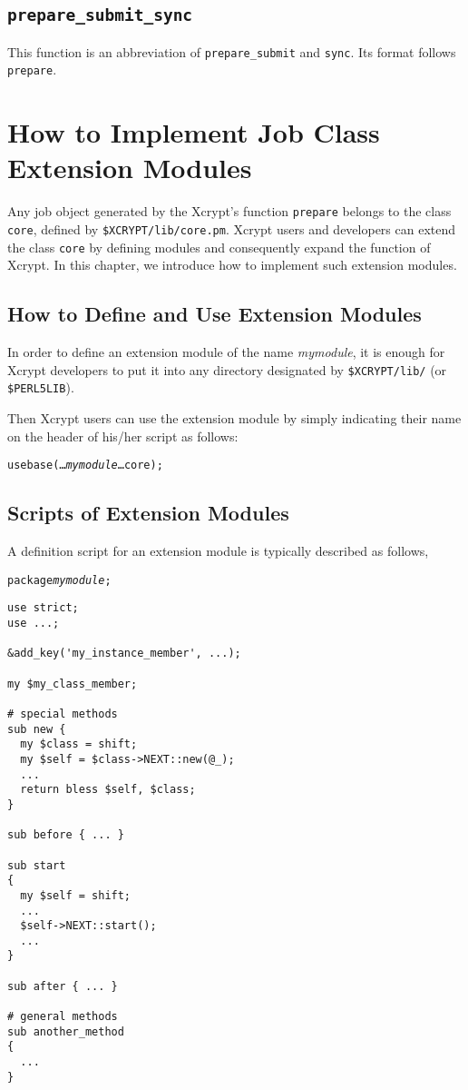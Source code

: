 \documentclass[a4paper,10pt]{report}
\def\|{\verb|} %|
\begin{document}
\section{\texttt{prepare\_submit\_sync}}

This function is an abbreviation of \texttt{prepare\_submit} and
\texttt{sync}.  Its format follows \texttt{prepare}.

\appendix
\chapter{How to Implement Job Class Extension Modules}

Any job object generated by the Xcrypt's function \|prepare| belongs
to the class \|core|, defined by \|$XCRYPT/lib/core.pm|.
Xcrypt users and developers can extend the class \|core| by defining
modules and consequently expand the function of Xcrypt.
In this chapter, we introduce how to implement such extension modules.

\section{How to Define and Use Extension Modules}

In order to define an extension module of the name \textit{mymodule},
it is enough for Xcrypt developers to put it into any directory
designated by \|$XCRYPT/lib/| (or \|$PERL5LIB|).

Then Xcrypt users can use the extension module by simply indicating
their name on the header of his/her script as follows:
\begin{screen}
\begin{alltt}
use base (\ldots {\it mymodule} \ldots core);
\end{alltt}
\end{screen}


\section{Scripts of Extension Modules}

A definition script for an extension module is typically described as follows,
\begin{boxnote}
  \begin{alltt}
package {\it mymodule};
  \end{alltt}
\begin{verbatim}
use strict;
use ...;

&add_key('my_instance_member', ...);

my $my_class_member;

# special methods
sub new {
  my $class = shift;
  my $self = $class->NEXT::new(@_);
  ... 
  return bless $self, $class;
}

sub before { ... }

sub start
{
  my $self = shift;
  ...
  $self->NEXT::start();
  ...
}

sub after { ... }

# general methods
sub another_method
{
  ...
}
\end{verbatim}
\end{boxnote}
\vspace{\baselineskip}
\end{document}
